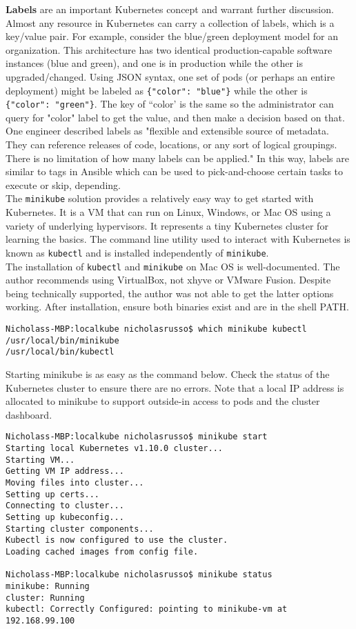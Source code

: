 \textbf{Labels} are an important Kubernetes concept and warrant further
discussion. Almost any resource in Kubernetes can carry a collection of
labels, which is a key/value pair. For example, consider the blue/green
deployment model for an organization. This architecture has two identical
production-capable software instances (blue and green), and one is in
production while the other is upgraded/changed. Using JSON syntax, one set of
pods (or perhaps an entire deployment) might be labeled as \verb|{"color": "blue"}|
while the other is \verb|{"color": "green"}|. The key of ``color' is the same so
the administrator can query for "color" label to get the value, and then make
a decision based on that. One engineer described labels as "flexible and
extensible source of metadata. They can reference releases of code, locations,
or any sort of logical groupings. There is no limitation of how many labels
can be applied." In this way, labels are similar to tags in Ansible which can
be used to pick-and-choose certain tasks to execute or skip, depending. \\

The \verb|minikube| solution provides a relatively easy way to get started
with Kubernetes. It is a VM that can run on Linux, Windows, or Mac OS using a
variety of underlying hypervisors. It represents a tiny Kubernetes cluster for
learning the basics. The command line utility used to interact with Kubernetes
is known as \verb|kubectl| and is installed independently of \verb|minikube|. \\

The installation of \verb|kubectl| and \verb|minikube| on Mac OS is
well-documented. The author recommends using VirtualBox, not xhyve or VMware
Fusion. Despite being technically supported, the author was not able to get
the latter options working. After installation, ensure both binaries exist and
are in the shell PATH.

\begin{verbatim}
Nicholass-MBP:localkube nicholasrusso$ which minikube kubectl
/usr/local/bin/minikube
/usr/local/bin/kubectl
\end{verbatim}

Starting minikube is as easy as the command below. Check the status of the
Kubernetes cluster to ensure there are no errors. Note that a local IP address
is allocated to minikube to support outside-in access to pods and the cluster
dashboard.

\begin{verbatim}
Nicholass-MBP:localkube nicholasrusso$ minikube start
Starting local Kubernetes v1.10.0 cluster...
Starting VM...
Getting VM IP address...
Moving files into cluster...
Setting up certs...
Connecting to cluster...
Setting up kubeconfig...
Starting cluster components...
Kubectl is now configured to use the cluster.
Loading cached images from config file.

Nicholass-MBP:localkube nicholasrusso$ minikube status
minikube: Running
cluster: Running
kubectl: Correctly Configured: pointing to minikube-vm at 192.168.99.100
\end{verbatim}

